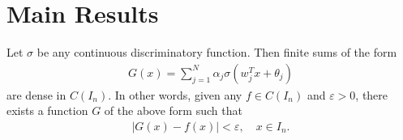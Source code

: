 \documentclass[12pt]{article}
\begin{document}
\section{Main Results}

\begin{mytheorem}
    Let $\sigma$ be any continuous discriminatory function. Then finite sums of the form
    \begin{align}
        G(x)=\sum_{j=1}^N \alpha_j \sigma (w_j^T x +\theta_j)
    \end{align}
    are dense in $C(I_n)$. In other words, given any $f \in C(I_n)$ and $\varepsilon > 0$, there exists a function $G$ of the above form such that
    \begin{align*}
        |G(x)-f(x)|<\varepsilon, \quad x\in I_n.
    \end{align*}
\end{mytheorem}
\end{document}
